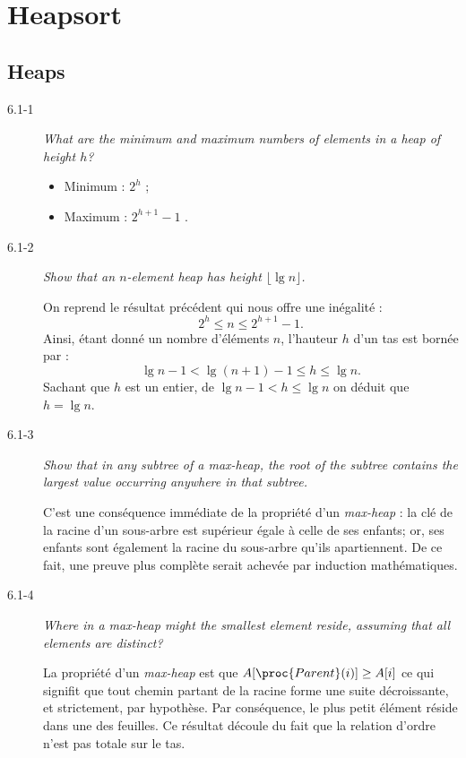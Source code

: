 \section{Heapsort}

\subsection{Heaps}

\begin{description}
  \item[6.1-1] {\itshape What are the minimum and maximum numbers of elements in a heap of height $h$?} %
    \begin{ex}
      \begin{itemize}
        \item Minimum : $2^{h}$ ;
        \item Maximum : $2^{h+1}-1$ .
      \end{itemize}
    \end{ex}
  \item[6.1-2] {\itshape Show that an $n$-element heap has height $\lfloor \lg n \rfloor$.}
    \begin{ex}
      On reprend le r\'esultat pr\'ec\'edent qui nous offre une in\'egalit\'e :
      $$2^h \le n \le 2^{h+1}-1.$$
      Ainsi, \'etant donn\'e un nombre d'\'el\'ements $n$, l'hauteur $h$ d'un tas est born\'ee par :
      $$\lg n -1  < \lg(n+1)-1 \le h \le \lg n.$$
      Sachant que $h$ est un entier, de $\lg n - 1 < h \le \lg n$ on d\'eduit que $h = \lg n$.
    \end{ex}
  \item[6.1-3] {\itshape Show that in any subtree of a max-heap, the root of the subtree contains the largest value occurring anywhere in that subtree.}
    \begin{ex} %
      C'est une cons\'equence imm\'ediate de la propri\'et\'e d'un {\itshape max-heap} : la cl\'e de la racine d'un sous-arbre est sup\'erieur \'egale \`a celle de ses enfants; or, ses enfants sont \'egalement la racine du sous-arbre qu'ils apartiennent. De ce fait, une preuve plus compl\`ete serait achev\'ee par induction math\'ematiques.
    \end{ex}
  \item[6.1-4] {\itshape Where in a max-heap might the smallest element reside, assuming that all elements are distinct?}
    \begin{ex}
      La propri\'et\'e d'un {\itshape max-heap} est que $A[\proc{Parent}(i)] \ge A[i]$ ce qui signifit que tout chemin partant de la racine forme une suite d\'ecroissante, et strictement, par hypoth\`ese. Par cons\'equence, le plus petit \'el\'ement r\'eside dans une des feuilles. Ce r\'esultat d\'ecoule du fait que la relation d'ordre n'est pas totale sur le tas.

\end{ex}
\end{description}
